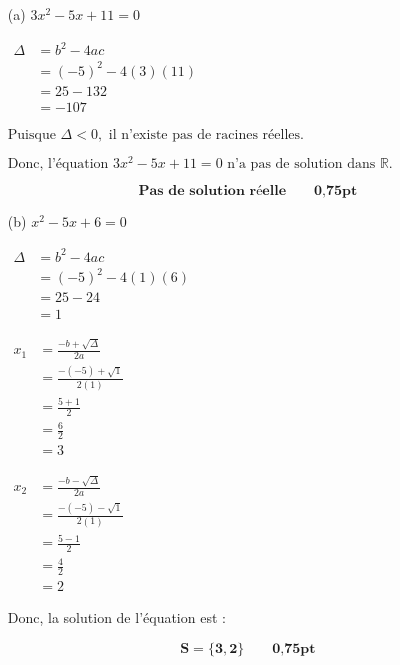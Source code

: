 \documentclass[12pt,a4paper]{article}
\begin{document}
\begin{enumerate}
    \item[(a)] \( 3x^2 - 5x + 11 = 0 \)

\(
\begin{aligned}
\Delta &= b^2 - 4ac \\
       &= (-5)^2 - 4(3)(11) \\
       &= 25 - 132 \\
       &= -107
\end{aligned}
\)

\(
\text{Puisque } \Delta < 0, \text{ il n'existe pas de racines réelles.}
\)

\(
\text{Donc, l'équation } 3x^2 - 5x + 11 = 0 \text{ n'a pas de solution dans } \mathbb{R}.
\)

\begin{tcolorbox}[colback=yellow!20, colframe=black, sharp corners]
    \[
    \mathbf{\text{Pas de solution réelle}}\quad\quad \textbf{0,75pt}
    \]
\end{tcolorbox}
 
    \item[(b)] \( x^2 - 5x + 6 = 0 \) 


\(
\begin{aligned}
\Delta &= b^2 - 4ac \\
       &= (-5)^2 - 4(1)(6) \\
       &= 25 - 24 \\
       &= 1
\end{aligned}
\)

\(
\begin{aligned}
x_1 &= \frac{-b + \sqrt{\Delta}}{2a} \\
    &= \frac{-(-5) + \sqrt{1}}{2(1)} \\
    &= \frac{5 + 1}{2} \\
    &= \frac{6}{2} \\
    &= 3
\end{aligned}
\)

\(
\begin{aligned}
x_2 &= \frac{-b - \sqrt{\Delta}}{2a} \\
    &= \frac{-(-5) - \sqrt{1}}{2(1)} \\
    &= \frac{5 - 1}{2} \\
    &= \frac{4}{2} \\
    &= 2
\end{aligned}
\)

Donc, la solution de l'équation est :

\begin{tcolorbox}[colback=yellow!20, colframe=black, sharp corners]
    \[
    \mathbf{S = \{ 3, 2 \}}\quad\quad \textbf{0,75pt}
    \]
\end{tcolorbox}


\end{enumerate}
\end{document}
